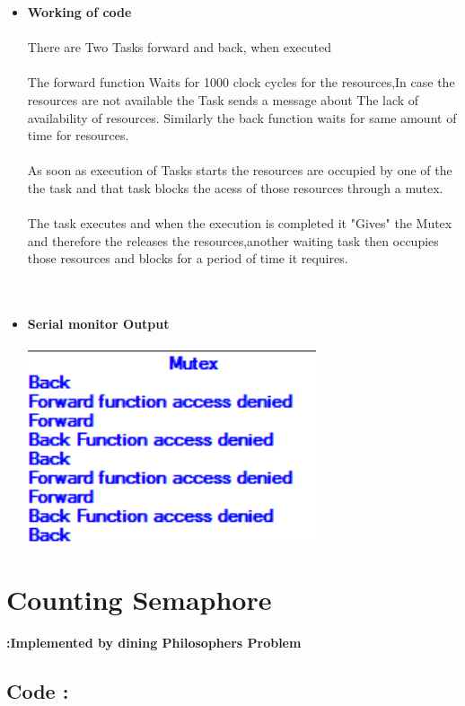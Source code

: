 \documentclass[11pt,a4paper]{article}
\begin{document}
\begin{itemize}
	\item \textbf{Working of code}
	\\
	\\
	There are Two Tasks forward and back, when executed
	\\
	\\
	The forward function Waits for 1000 clock cycles for the resources,In case the resources are not available the Task sends a message about The lack of availability of resources.
		Similarly the back function waits for same amount of time for resources.
	\\
	\\	
	As soon as execution of Tasks starts the resources are occupied by one of the the task and that task blocks the acess of those resources through a mutex.
	\\
	\\
The task executes and when the execution is completed it "Gives" the Mutex and therefore the releases the resources,another waiting task then occupies those resources and blocks for a period of time it requires.
	\\
	\\
	\\
	\item \textbf{Serial monitor Output} 
	\\
	\\
	\includegraphics[width=8.5cm]{mut}
\end{itemize}

\newpage 

\section{Counting Semaphore }

\textbf{:Implemented by dining Philosophers Problem}
\subsection{Code : }
	
\newpage
\end{document}
